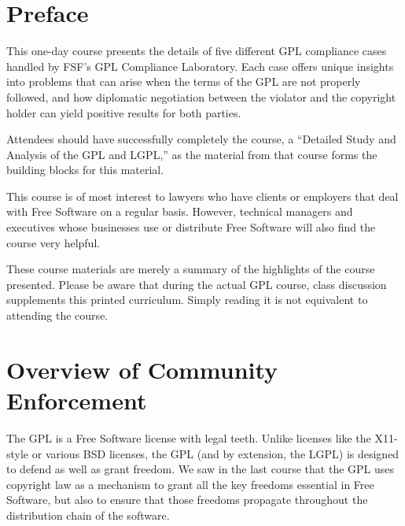 \chapter*{Preface}

This one-day course presents the details of five different GPL
compliance cases handled by FSF's GPL Compliance Laboratory. Each case
offers unique insights into problems that can arise when the terms of
the GPL are not properly followed, and how diplomatic negotiation between
the violator and the copyright holder can yield positive results for
both parties.

Attendees should have successfully completely the course, a ``Detailed
Study and Analysis of the GPL and LGPL,'' as the material from that
course forms the building blocks for this material.

This course is of most interest to lawyers who have clients or
employers that deal with Free Software on a regular basis. However,
technical managers and executives whose businesses use or distribute
Free Software will also find the course very helpful.

\bigskip

These course materials are merely a summary of the highlights of the
course presented. Please be aware that during the actual GPL course, class
discussion supplements this printed curriculum. Simply reading it is
not equivalent to attending the course.





\chapter{Overview of Community Enforcement}

The GPL is a Free Software license with legal teeth. Unlike licenses like
the X11-style or various BSD licenses, the GPL (and by extension, the LGPL) is
designed to defend as well as grant freedom. We saw in the last course
that the GPL uses copyright law as a mechanism to grant all the key freedoms
essential in Free Software, but also to ensure that those freedoms
propagate throughout the distribution chain of the software.

